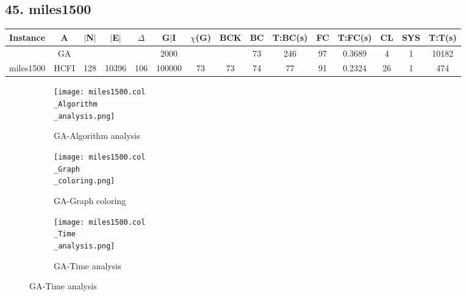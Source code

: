 \documentclass[10pt]{article}
\begin{document}
\subsection*{\hspace{0,9073976cm} 45. miles1500 }
\begin{table}[H]
\centering
\begin{tabular}{|c|c|c|c|c|c|c|c|c|c|c|c|c|c|c|}
\hline
Instance& A &$|$N$|$ & $|$E$|$ & $\Delta$ & G$|$I & $\chi$(G) &BCK&BC & T:BC(s) & FC & T:FC(s) & CL & SYS & T:T(s) \\ \hline \hline

&GA&       &                   &                     & 2000        &     \cellcolor{yellow} & {\cellcolor{yellow}}& {{\cellcolor{green}73}}
&246   &97        &0.3689                   & 4                   &1          &10182        \\ \cline{2-2} \cline{6-6} \cline{9-15}
 \multirow{-2}{*}{miles1500} &HCFI   &\multirow{-2}{*}{128}   &\multirow{-2}{*}{10396}     &\multirow{-2}{*}{106}     &100000     &\multirow{-2}{*}{\cellcolor{yellow}73}      & \multirow{-2}{*}{\cellcolor{yellow}73}    &{\cellcolor{green}74}     &77         &91    &0.2324         &26    &1     &474        \\ \hline
\end{tabular}
\end{table}
\graphicspath{{./Core1/Solutions/GA/miles1500.col}}
\begin{figure}[H]
\begin{subfigure}{.33\textwidth}
  \centering
  \texttt{[image: miles1500.col\\\_Algorithm\\\_analysis.png]}
  \caption{GA-Algorithm analysis}
   \label{fig:subfig1}
\end{subfigure}%
\begin{subfigure}{.33\textwidth}
  \centering
  \texttt{[image: miles1500.col\\\_Graph\\\_coloring.png]}
  \caption{GA-Graph coloring}
  \label{fig:subfig2}
\end{subfigure}
\begin{subfigure}{.33\textwidth}
  \centering
  \texttt{[image: miles1500.col\\\_Time\\\_analysis.png]}
  \caption{GA-Time analysis}
  \end{subfigure}
\end{figure}
\end{document}
